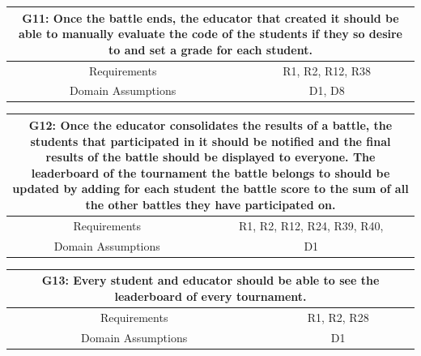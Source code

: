 \documentclass{article}
\begin{document}
\begin{table}[H]
    \centering
    \begin{tabular*}{\linewidth}{@{\extracolsep{\fill}} cc }
        \hline
        \multicolumn{2}{|c|}{\parbox{0.9\dimexpr\textwidth-2\tabcolsep\relax}{\centering\textbf{G11: Once the battle ends, the educator that created it should be able to manually evaluate the code of the students if they so desire to and set a grade for each student.}}} \\
        \hline
        Requirements & R1, R2, R12, R38\\
        \hline
        Domain Assumptions & D1, D8\\
        \hline
    \end{tabular*}
\end{table}

\begin{table}[H]
    \centering
    \begin{tabular*}{\linewidth}{@{\extracolsep{\fill}} cc }
        \hline
        \multicolumn{2}{|c|}{\parbox{0.9\dimexpr\textwidth-2\tabcolsep\relax}{\centering\textbf{G12: Once the educator consolidates the results of a battle, the students that participated in it should be notified and the final results of the battle should be displayed to everyone. The leaderboard of the tournament the battle belongs to should be updated by adding for each student the battle score to the sum of all the other battles they have participated on.
        }}} \\
        \hline
        Requirements & R1, R2, R12, R24, R39, R40, \\
        \hline
        Domain Assumptions & D1\\
        \hline
    \end{tabular*}
\end{table}

\begin{table}[H]
    \centering
    \begin{tabular*}{\linewidth}{@{\extracolsep{\fill}} cc }
        \hline
        \multicolumn{2}{|c|}{\parbox{0.9\dimexpr\textwidth-2\tabcolsep\relax}{\centering\textbf{G13: Every student and educator should be able to see the leaderboard of every tournament.}}} \\
        \hline
        Requirements & R1, R2, R28\\
        \hline
        Domain Assumptions & D1\\
        \hline
    \end{tabular*}
\end{table}
\end{document}
